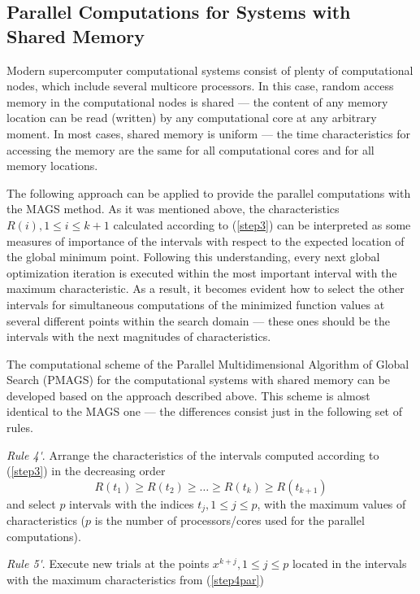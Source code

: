 \documentclass{naco}
\theoremstyle{definition}
\begin{document}
\subsection{Parallel Computations for Systems with Shared Memory}
\label{subsec:sharedpar}
Modern supercomputer computational systems consist of plenty of computational nodes,
which include several multicore processors. In this case, random access memory
in the computational nodes is shared --- the content of any memory location can be read
(written) by any computational core at any arbitrary moment. In most cases, shared memory is
uniform --- the time characteristics for accessing the memory are the same for all
computational cores and for all memory locations.
\par
The following approach can be applied to provide the parallel computations with the MAGS method.
As it was mentioned above, the characteristics \(R(i),1\leq i\leq k+1\) calculated
according to (\ref{step3}) can be interpreted as some measures of importance of the
intervals with respect to the expected location of the global minimum point.
Following this understanding, every next global optimization iteration is executed within
the most important interval with the maximum characteristic. As a result, it becomes
evident how to select the other intervals for simultaneous computations of the minimized
function values at several different points within the search domain --- these ones
should be the intervals with the next magnitudes of characteristics.
\par
The computational scheme of the Parallel Multidimensional Algorithm of Global Search (PMAGS)
for the computational systems with shared memory can be developed based on the approach
described above. This scheme is almost identical to the MAGS one --- the differences
consist just in the following set of rules.
\par
\textit{Rule 4\'}. Arrange the characteristics of the intervals computed according to (\ref{step3}) in the decreasing order
\begin{equation}
\label{step4par}
R(t_1)\geq R(t_2)\geq \dots \geq R(t_{k})\geq R(t_{k+1})
\end{equation}
and select \(p\) intervals with the indices \(t_j,1\leq j\leq p\), with the maximum
values of characteristics (\(p\) is the number of processors/cores used for the parallel computations).
\par
\textit{Rule 5\'}. Execute new trials at the points \(x^{k+j},1\leq j\leq p\) located
in the intervals with the maximum characteristics from (\ref{step4par})
\end{document}
